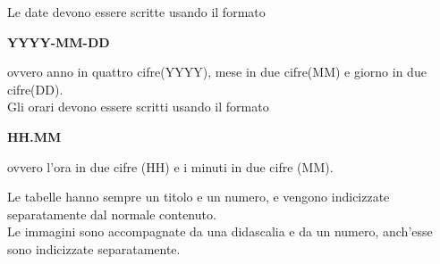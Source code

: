         Le date devono essere scritte usando il formato
        \begin{center}
          \textbf{YYYY-MM-DD}
        \end{center}
        ovvero anno in quattro cifre(YYYY), mese in due cifre(MM) e giorno in due cifre(DD).\\
        Gli orari devono essere scritti usando il formato
        \begin{center}
          \textbf{HH.MM}
        \end{center}
        ovvero l'ora in due cifre (HH) e i minuti in due cifre (MM).

        Le tabelle hanno sempre un titolo e un numero, e vengono indicizzate separatamente dal normale contenuto.\\
        Le immagini sono accompagnate da una didascalia e da un numero, anch'esse sono indicizzate separatamente.

